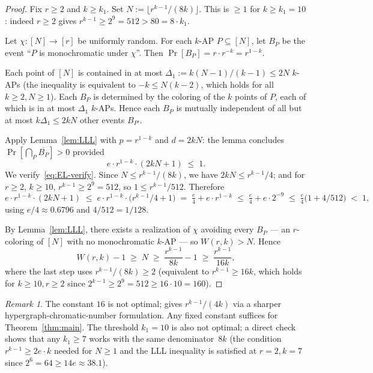 \documentclass[11pt,reqno,a4paper]{amsart}
\theoremstyle{plain}
\theoremstyle{definition}
\theoremstyle{remark}
\newtheorem{remark}[theorem]{Remark}
\numberwithin{equation}{section}
\begin{document}
\begin{proof}
Fix $r\ge 2$ and $k\ge k_{1}$. Set $N:=\lfloor r^{k-1}/(8k)\rfloor$.
This is $\ge 1$ for $k\ge k_{1}=10$: indeed $r\ge 2$ gives
$r^{k-1}\ge 2^{9}=512>80=8\cdot k_{1}$.

Let $\chi:[N]\to[r]$ be uniformly random. For each $k$-AP
$P\subseteq[N]$, let $B_{P}$ be the event ``$P$ is monochromatic under
$\chi$''. Then $\Pr[B_{P}]=r\cdot r^{-k}=r^{1-k}$.

Each point of $[N]$ is contained in at most
$\Delta_{1}:=k(N-1)/(k-1)\le 2N$ $k$-APs (the inequality is
equivalent to $-k\le N(k-2)$, which holds for all $k\ge 2,N\ge 1$).
Each $B_{P}$ is determined by the coloring of the $k$ points of $P$,
each of which is in at most $\Delta_{1}$ $k$-APs. Hence each $B_{P}$
is mutually independent of all but at most $k\Delta_{1}\le 2kN$
other events $B_{P'}$.

Apply Lemma~\ref{lem:LLL} with $p=r^{1-k}$ and $d=2kN$: the lemma
concludes $\Pr[\bigcap_{P}\overline{B_{P}}]>0$ provided
\begin{equation}
e\cdot r^{1-k}\cdot(2kN+1)\;\le\;1.
\label{eq:EL-verify}
\end{equation}
We verify~\eqref{eq:EL-verify}. Since $N\le r^{k-1}/(8k)$, we have
$2kN\le r^{k-1}/4$; and for $r\ge 2$, $k\ge 10$, $r^{k-1}\ge 2^{9}=512$, so
$1\le r^{k-1}/512$. Therefore
\[
e\cdot r^{1-k}\cdot(2kN+1)
\;\le\;e\cdot r^{1-k}\cdot\bigl(r^{k-1}/4+1\bigr)
\;=\;\tfrac{e}{4}+e\cdot r^{1-k}
\;\le\;\tfrac{e}{4}+e\cdot 2^{-9}
\;\le\;\tfrac{e}{4}\bigl(1+4/512\bigr)
\;<\;1,
\]
using $e/4\approx 0.6796$ and $4/512=1/128$.

By Lemma~\ref{lem:LLL}, there exists a realization of $\chi$ avoiding
every $B_{P}$ --- an $r$-coloring of $[N]$ with no monochromatic
$k$-AP --- so $W(r,k)>N$. Hence
\[
W(r,k)-1\;\ge\;N\;\ge\;\frac{r^{k-1}}{8k}-1\;\ge\;\frac{r^{k-1}}{16k},
\]
where the last step uses $r^{k-1}/(8k)\ge 2$ (equivalent to
$r^{k-1}\ge 16k$, which holds for $k\ge 10,r\ge 2$ since
$2^{k-1}\ge 2^{9}=512\ge 16\cdot 10=160$).
\end{proof}

\begin{remark}
\label{rem:EL-constant}
The constant $16$ is not optimal; \cite[Ch.~5]{AlonSpencer2016}
gives $r^{k-1}/(4k)$ via a sharper hypergraph-chromatic-number
formulation. Any fixed constant suffices for
Theorem~\ref{thm:main}. The threshold $k_{1}=10$ is also not optimal;
a direct check shows that any $k_{1}\ge 7$ works with the same
denominator~$8k$ (the condition $r^{k-1}\ge 2e\cdot k$ needed for
$N\ge 1$ and the LLL inequality is satisfied at $r=2,k=7$ since
$2^{6}=64\ge 14e\approx 38.1$).
\end{remark}
\end{document}
